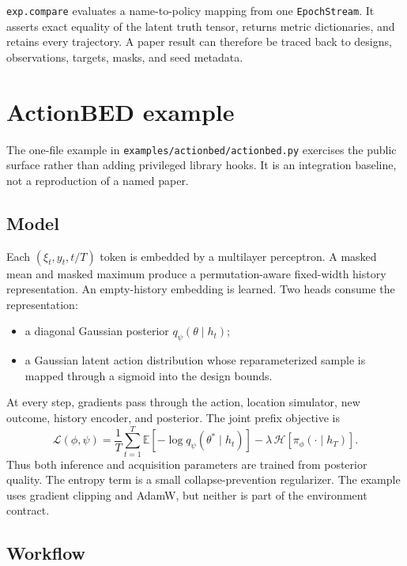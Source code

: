 \documentclass[11pt]{article}
\begin{document}
\texttt{exp.compare} evaluates a name-to-policy mapping from one \texttt{EpochStream}.
It asserts exact equality of the latent truth tensor, returns metric dictionaries, and
retains every trajectory. A paper result can therefore be traced back to designs,
observations, targets, masks, and seed metadata.

\section{ActionBED example}

The one-file example in \texttt{examples/actionbed/actionbed.py} exercises the public
surface rather than adding privileged library hooks. It is an integration baseline,
not a reproduction of a named paper.

\subsection{Model}

Each $(\xi_t,y_t,t/T)$ token is embedded by a multilayer perceptron. A masked mean and
masked maximum produce a permutation-aware fixed-width history representation. An
empty-history embedding is learned. Two heads consume the representation:
\begin{itemize}
  \item a diagonal Gaussian posterior $q_\psi(\theta\mid h_t)$;
  \item a Gaussian latent action distribution whose reparameterized sample is mapped
  through a sigmoid into the design bounds.
\end{itemize}
At every step, gradients pass through the action, location simulator, new outcome,
history encoder, and posterior. The joint prefix objective is
\begin{equation}
 \mathcal L(\phi,\psi)=
 \frac{1}{T}\sum_{t=1}^{T}
 \mathbb E[-\log q_\psi(\theta^*\mid h_t)]
 -\lambda\,\mathcal H[\pi_\phi(\cdot\mid h_T)].
\end{equation}
Thus both inference and acquisition parameters are trained from posterior quality.
The entropy term is a small collapse-prevention regularizer. The example uses gradient
clipping and AdamW, but neither is part of the environment contract.

\subsection{Workflow}
\end{document}
